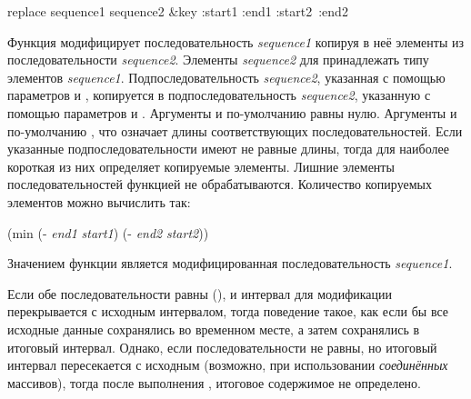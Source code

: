 \begin{defun}[Функция]
replace sequence1 sequence2 &key :start1 :end1 :start2~:end2

Функция модифицирует последовательность \emph{sequence1} копируя в неё элементы
из последовательности \emph{sequence2}. Элементы \emph{sequence2} для
принадлежать типу элементов \emph{sequence1}. Подпоследовательность
\emph{sequence2}, указанная с помощью параметров  и ,
копируется в подпоследовательность \emph{sequence2}, указанную с помощью
параметров  и . Аргументы  и 
по-умолчанию равны нулю. Аргументы  и  по-умолчанию
{\false}, что означает длины соответствующих последовательностей.
Если указанные подпоследовательности имеют не равные длины, тогда для наиболее
короткая из них определяет копируемые элементы. Лишние элементы
последовательностей функцией не обрабатываются.
Количество копируемых элементов можно вычислить так:
\begin{lisp}
(min (- \emph{end1} \emph{start1}) (- \emph{end2} \emph{start2}))
\end{lisp}
Значением функции  является модифицированная последовательность
\emph{sequence1}.

Если обе последовательности равны (), и интервал для модификации
перекрывается с исходным интервалом, тогда поведение такое, как если бы все
исходные данные сохранялись во временном месте, а затем сохранялись в итоговый
интервал.
Однако, если последовательности не равны, но итоговый интервал пересекается с
исходным (возможно, при использовании \emph{соединённых} массивов), тогда
после выполнения , итоговое содержимое не определено.
\end{defun}

